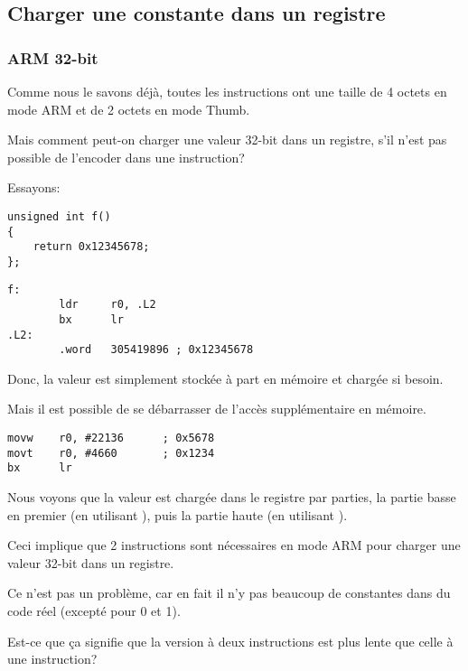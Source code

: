 ﻿\subsection{Charger une constante dans un registre}
\label{ARM_big_constants}

\subsubsection{ARM 32-bit}
\label{ARM_big_constants_loading}

Comme nous le savons déjà, toutes les instructions ont une taille de 4 octets en
mode ARM et de 2 octets en mode Thumb.

Mais comment peut-on charger une valeur 32-bit dans un registre, s'il n'est pas possible
de l'encoder dans une instruction?

Essayons:

\begin{lstlisting}[style=customc]
unsigned int f()
{
	return 0x12345678;
};
\end{lstlisting}

\begin{lstlisting}[caption=GCC 4.6.3 -O3 \ARMMode,style=customasmARM]
f:
        ldr     r0, .L2
        bx      lr
.L2:
        .word   305419896 ; 0x12345678
\end{lstlisting}

Donc, la valeur  est simplement stockée à part en mémoire et chargée
si besoin.

Mais il est possible de se débarrasser de l'accès supplémentaire en mémoire.

\begin{lstlisting}[caption=GCC 4.6.3 -O3 -march{=}armv7-a (\ARMMode),style=customasmARM]
movw    r0, #22136      ; 0x5678
movt    r0, #4660       ; 0x1234
bx      lr
\end{lstlisting}

Nous voyons que la valeur est chargée dans le registre par parties, la partie basse
en premier (en utilisant ), puis la partie haute (en utilisant ).

Ceci implique que 2 instructions sont nécessaires en mode ARM pour charger une valeur
32-bit dans un registre.

Ce n'est pas un problème, car en fait il n'y pas beaucoup de constantes dans du code
réel (excepté pour 0 et 1).

Est-ce que ça signifie que la version à deux instructions est plus lente que celle
à une instruction?

